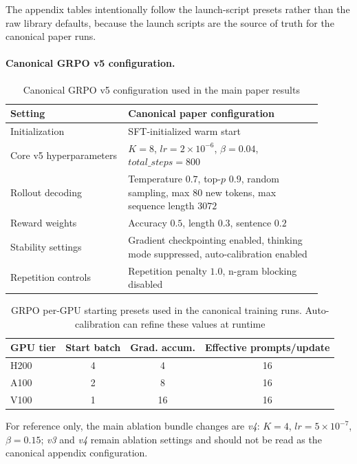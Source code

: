 \documentclass[11pt]{article}
\begin{document}
The appendix tables intentionally follow the launch-script presets rather than the raw library defaults, because the launch scripts are the source of truth for the canonical paper runs.

\paragraph{Canonical GRPO v5 configuration.}
\begin{table}[H]
\centering
\caption{Canonical GRPO v5 configuration used in the main paper results}
\label{tab:appendix-grpo-config}
\small
\begin{tabular}{L{0.34\linewidth}L{0.56\linewidth}}
\toprule
Setting & Canonical paper configuration \\
\midrule
Initialization & SFT-initialized warm start \\
Core v5 hyperparameters & $K = 8$, $\mathit{lr} = 2\times10^{-6}$, $\beta = 0.04$, $\mathit{total\_steps} = 800$ \\
Rollout decoding & Temperature $0.7$, top-$p$ $0.9$, random sampling, max $80$ new tokens, max sequence length $3072$ \\
Reward weights & Accuracy $0.5$, length $0.3$, sentence $0.2$ \\
Stability settings & Gradient checkpointing enabled, thinking mode suppressed, auto-calibration enabled \\
Repetition controls & Repetition penalty $1.0$, n-gram blocking disabled \\
\bottomrule
\end{tabular}
\end{table}

\begin{table}[H]
\centering
\caption{GRPO per-GPU starting presets used in the canonical training runs. Auto-calibration can refine these values at runtime}
\label{tab:appendix-grpo-gpu}
\small
\begin{tabular}{lccc}
\toprule
GPU tier & Start batch & Grad. accum. & Effective prompts/update \\
\midrule
H200 & 4 & 4 & 16 \\
A100 & 2 & 8 & 16 \\
V100 & 1 & 16 & 16 \\
\bottomrule
\end{tabular}
\end{table}

For reference only, the main ablation bundle changes are \textit{v4}: $K=4$, $\mathit{lr} = 5\times10^{-7}$, $\beta = 0.15$; \textit{v3} and \textit{v4} remain ablation settings and should not be read as the canonical appendix configuration.
\end{document}
